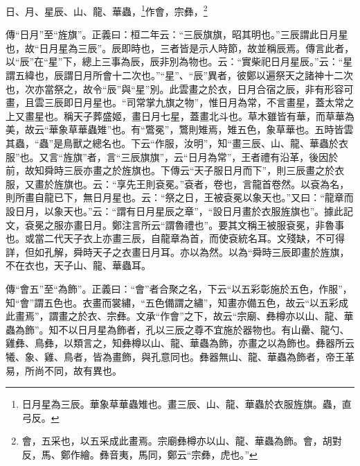 日、月、星辰、山、龍、華蟲，\footnote{日月星為三辰。華象草華蟲雉也。畫三辰、山、龍、華蟲於衣服旌旗。蟲，直弓反。}作會，宗彝，\footnote{會，五采也，以五采成此畫焉。宗廟彝樽亦以山、龍、華蟲為飾。會，胡對反，馬、鄭作繪。彝音夷，馬同，鄭云“宗彝，虎也。”}


{\noindent\zhuan{}\fzbyks 傳“日月”至“旌旗”。正義曰：桓二年云：“三辰旗旗，昭其明也。”三辰謂此日月星也，故“日月星為三辰”。辰即時也，三者皆是示人時節，故並稱辰焉。傳言此者，以“辰”在“星”下，總上三事為辰，辰非別為物也。云：“實柴祀日月星辰。”云：“星謂五緯也，辰謂日月所會十二次也。”“星”、“辰”異者，彼鄭以遍祭天之諸神十二次也，次亦當祭之，故令“辰”與“星”別。此雲畫之於衣，日月合宿之辰，非有形容可畫，且雲三辰即日月星也。“司常掌九旗之物”，惟日月為常，不言畫星，蓋太常之上又畫星也。稱天子葬盛姬，畫日月七星，蓋畫北斗也。草木雖皆有華，而草華為美，故云“華象草華蟲雉”也。有“鷩冕”，鷩則雉焉，雉五色，象草華也。五時皆雲其蟲，“蟲”是鳥獸之總名也。下云“作服，汝明”，知“畫三辰、山、龍、華蟲於衣服”也。又言“旌旗”者，言“三辰旗旗”，云“日月為常”，王者禮有沿革，後因於前，故知舜時三辰亦畫之於旌旗也。下傳云“天子服日月而下”，則三辰畫之於衣服，又畫於旌旗也。云：“享先王則袞冕。”袞者，卷也，言龍首卷然。以袞為名，則所畫自龍已下，無日月星也。云：“祭之日，王被袞冕以象天也。”又曰：“龍章而設日月，以象天也。”云：“謂有日月星辰之章”，“設日月畫於衣服旌旗也”。據此記文，袞冕之服亦畫日月。鄭注言所云“謂魯禮也”。要其文稱王被服袞冕，非魯事也。或當二代天子衣上亦畫三辰，自龍章為首，而使袞統名耳。文殘缺，不可得詳，但如孔解，舜時天子之衣畫日月耳。亦以為然。以為“舜時三辰即畫於旌旗，不在衣也，天子山、龍、華蟲耳。 \par}

{\noindent\zhuan{}\fzbyks 傳“會五”至“為飾”。正義曰：“會”者合聚之名，下云“以五彩彰施於五色，作服”，知“會”謂五色也。衣畫而裳繡，“五色備謂之繡”，知畫亦備五色，故云“以五彩成此畫焉”，謂畫之於衣、宗彝。文承“作會”之下，故云“宗廟、彝樽亦以山、龍、華蟲為飾”。知不以日月星為飾者，孔以三辰之尊不宜施於器物也。有山罍、龍勺、雞彝、鳥彝，以類言之，知彝樽以山、龍、華蟲為飾，亦畫之以為飾也。彝器所云犧、象、雞、鳥者，皆為畫飾，與孔意同也。彝器無山、龍、華蟲為飾者，帝王革易，所尚不同，故有異也。 \par}

